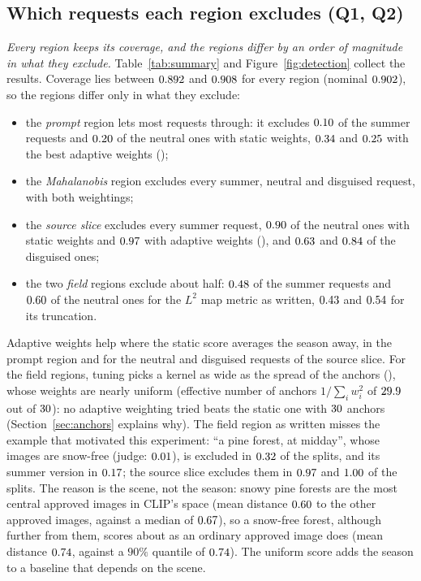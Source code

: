 \documentclass{article}
\begin{document}
\subsection{Which requests each region excludes (Q1, Q2)}\label{sec:detection}

\emph{Every region keeps its coverage, and the regions differ by an order of magnitude in what they exclude.}
Table~\ref{tab:summary} and Figure~\ref{fig:detection} collect the results. Coverage lies between $0.892$ and $0.908$ for
every region (nominal $0.902$), so the regions differ only in what they exclude:
\begin{itemize}
\item the \emph{prompt} region lets most requests through: it excludes $0.10$ of the summer requests and $0.20$ of the
neutral ones with static weights, $0.34$ and $0.25$ with the best adaptive weights (\ethVarEA);
\item the \emph{Mahalanobis} region excludes every summer, neutral and disguised request, with both weightings;
\item the \emph{source slice} excludes every summer request, $0.90$ of the neutral ones with static weights and
$0.97$ with adaptive weights (\ethVarPBA), and $0.63$ and $0.84$ of the disguised ones;
\item the two \emph{field} regions exclude about half: $0.48$ of the summer requests and $0.60$ of the neutral ones
for the $L^2$ map metric as written, $0.43$ and $0.54$ for its truncation.
\end{itemize}
Adaptive weights help where the static score averages the season away, in the prompt region and for the neutral and disguised
requests of the source slice. For the field regions, tuning picks a kernel as wide as the spread of the anchors (\ethVarTRA), whose
weights are nearly uniform (effective number of anchors $1/\sum_iw_i^2$ of $29.9$ out of $30$): no adaptive weighting tried
beats the static one with $30$ anchors (Section~\ref{sec:anchors} explains why). The field region as written misses the example that motivated this experiment: ``a pine forest, at midday'', whose images are
snow-free (judge: $0.01$), is excluded in $0.32$ of the splits, and its summer version in $0.17$; the
source slice excludes them in $0.97$ and $1.00$ of the splits. The reason is the scene, not the season: snowy
pine forests are the most central approved images in CLIP's space (mean distance $0.60$ to the other approved images,
against a median of $0.67$), so a snow-free forest, although further from them, scores about as an ordinary approved image
does (mean distance $0.74$, against a $90\%$ quantile of $0.74$). The uniform score adds the season to a baseline that
depends on the scene.
\end{document}
